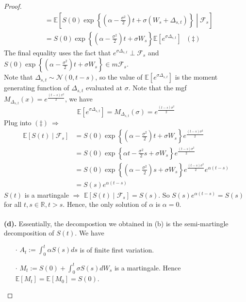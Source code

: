 \documentclass[a4paper, 10pt]{article}
\theoremstyle{definition}
\theoremstyle{hSol}
\begin{document}
\begin{proof}
\begin{equation}
\begin{split}
		&= \mathbb{E}\left[S(0)\exp\left\{\left(\alpha -\frac{\sigma^2}{2}\right)t + \sigma (W_s+\Delta_{s,t})\right\}\middle|\mathcal{F}_s\right] \\
		&= S(0)\exp\left\{\left(\alpha -\frac{\sigma^2}{2}\right)t + \sigma W_s\right\} \mathbb{E}\left[e^{\sigma \Delta_{s,t}}\right]~~~(\ddag)
	\end{split}
\end{equation}
The final equality uses the fact that $e^{\sigma \Delta_{s,t}} \perp \mathcal{F}_s$ and $S(0)\exp\left\{\left(\alpha -\frac{\sigma^2}{2}\right)t + \sigma W_s\right\} \in m \mathcal{F}_s$. \\
Note that $\Delta_{s,t} \sim \mathcal{N}(0,t-s)$, so the value of $ \mathbb{E}\left[e^{\sigma \Delta_{s,t}}\right]$ is the moment generating function of $\Delta_{s,t}$ evaluated at $\sigma$. Note that the mgf $M_{\Delta_{s,t}}(x) = e^{\frac{(t-s)x^2}{2}}$, we have
$$
\mathbb{E}\left[e^{\sigma \Delta_{s,t}}\right] = M_{\Delta_{s,t}}(\sigma) = e^{\frac{(t-s)\sigma^2}{2}}
$$
Plug into $(\ddag)~\Rightarrow$
\begin{equation}
	\begin{split}
		\mathbb{E}\left[S(t)\middle|\mathcal{F}_s\right] &= S(0)\exp\left\{\left(\alpha -\frac{\sigma^2}{2}\right)t + \sigma W_s\right\} e^{\frac{(t-s)\sigma^2}{2}} \\
		&=S(0)\exp\left\{\alpha t -\frac{\sigma^2}{2}s + \sigma W_s\right\} e^{\frac{(t-s)\sigma^2}{2}}\\
		&=S(0)\exp\left\{\left(\alpha  -\frac{\sigma^2}{2}\right)s + \sigma W_s\right\} e^{\frac{(t-s)\sigma^2}{2}} e^{\alpha(t-s)}\\
		&=S(s)e^{\alpha(t-s)}
	\end{split}
\end{equation}
$S(t)$ is a martingale $\Rightarrow$ $\mathbb{E}\left[S(t)\middle|\mathcal{F}_s\right] = S(s)$. So $S(s)e^{\alpha(t-s)} = S(s)$ for all $t,s \in \mathbb{R}, t>s$. Hence, the only solution of $\alpha$ is $\alpha = 0$.\\
~\\
\textbf{(d).} Essentially, the decompostion we obtained in (b) is the semi-martingle decomposition of $S(t)$. We have
\begin{itemize}
	\item[$\cdot$] $A_t := \int_0^t \alpha S(s) ds$ is of finite first variation.
	\item[$\cdot$] $M_t :=S(0) + \int_0^t \sigma S(s) dW_s$ is a martingale. Hence $\mathbb{E}\left[M_t\right] = \mathbb{E}\left[M_0\right] = S(0)$.

\end{itemize}
\end{proof}
\end{document}
